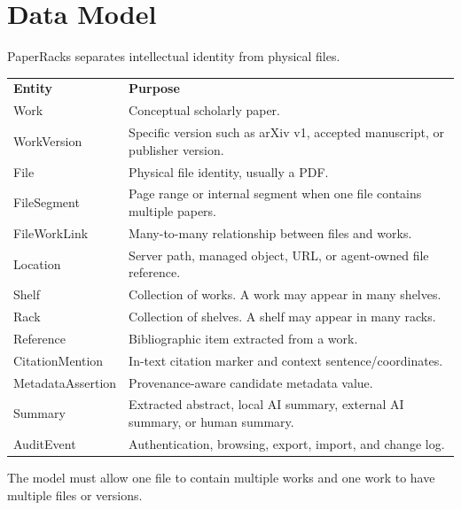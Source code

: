 \section{Data Model}

PaperRacks separates intellectual identity from physical files.

\begin{longtable}{p{}p{}}
\textbf{Entity} & \textbf{Purpose} \\
Work & Conceptual scholarly paper. \\
WorkVersion & Specific version such as arXiv v1, accepted manuscript, or publisher version. \\
File & Physical file identity, usually a PDF. \\
FileSegment & Page range or internal segment when one file contains multiple papers. \\
FileWorkLink & Many-to-many relationship between files and works. \\
Location & Server path, managed object, URL, or agent-owned file reference. \\
Shelf & Collection of works. A work may appear in many shelves. \\
Rack & Collection of shelves. A shelf may appear in many racks. \\
Reference & Bibliographic item extracted from a work. \\
CitationMention & In-text citation marker and context sentence/coordinates. \\
MetadataAssertion & Provenance-aware candidate metadata value. \\
Summary & Extracted abstract, local AI summary, external AI summary, or human summary. \\
AuditEvent & Authentication, browsing, export, import, and change log. \\
\end{longtable}

The model must allow one file to contain multiple works and one work to have multiple files or versions.
